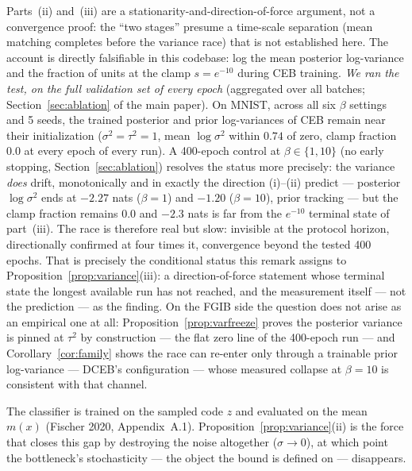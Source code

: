 \begin{remark}\label{rem:p3-status}
Parts~(ii) and~(iii) are a stationarity-and-direction-of-force argument, not a convergence
proof: the ``two stages'' presume a time-scale separation (mean matching completes before
the variance race) that is not established here. The account is directly falsifiable in
this codebase: log the mean posterior log-variance and the fraction of units at the clamp
$s = e^{-10}$ during CEB training. \emph{We ran the test, on the full validation set of
every epoch} (aggregated over all batches; Section~\ref{sec:ablation} of the main
paper). On MNIST, across all six
$\beta$ settings and 5 seeds, the trained
posterior and prior log-variances of CEB remain near their initialization ($\sigma^2 =
\tau^2 = 1$, mean $\log\sigma^2$ within $0.74$ of zero, clamp fraction $0.0$ at every
epoch of every run). A 400-epoch control at $\beta\in\{1,10\}$ (no early stopping,
Section~\ref{sec:ablation}) resolves the status more precisely: the variance \emph{does}
drift, monotonically and in exactly the direction (i)--(ii) predict --- posterior
$\log\sigma^2$ ends at $-2.27$ nats ($\beta=1$) and $-1.20$ ($\beta=10$), prior
tracking --- but the clamp fraction remains $0.0$ and $-2.3$ nats is far from the
$e^{-10}$ terminal state of part~(iii). The race is therefore real but slow: invisible
at the protocol horizon, directionally confirmed at four times it, convergence beyond
the tested 400 epochs. That is precisely the conditional status this remark assigns to
Proposition~\ref{prop:variance}(iii): a direction-of-force statement whose terminal
state the longest available run has not reached, and the measurement itself --- not the
prediction --- as the finding. On the FGIB side the question does not arise as an
empirical one at all: Proposition~\ref{prop:varfreeze} proves the posterior variance is
pinned at $\tau^2$ by construction --- the flat zero line of the 400-epoch run --- and
Corollary~\ref{cor:family} shows the race can
re-enter only through a trainable prior log-variance --- DCEB's configuration --- whose
measured collapse at $\beta=10$ is consistent with that channel.
\end{remark}

\begin{remark}\label{rem:mismatch}
The classifier is trained on the sampled code $z$ and evaluated on the mean $m(x)$
(Fischer 2020, Appendix~A.1). Proposition~\ref{prop:variance}(ii) is the force that
closes this gap by destroying the noise altogether ($\sigma \to 0$), at which point the
bottleneck's stochasticity --- the object the bound is defined on --- disappears.
\end{remark}

